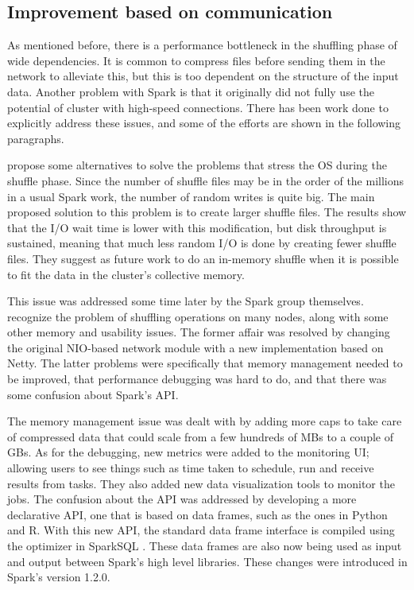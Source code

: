 \documentclass{article}
\begin{document}
\subsection{Improvement based on communication}

As mentioned before, there is a performance bottleneck in the shuffling phase of wide dependencies. It is common to compress files before sending them in the network to alleviate this, but this is too dependent on the structure of the input data. Another problem with Spark is that it originally did not fully use the potential of cluster with high-speed connections. There has been work done to explicitly address these issues, and some of the efforts are shown in the following paragraphs.

\citeauthor{davidson2013optimizing} \cite{davidson2013optimizing} propose some alternatives to solve the problems that stress the OS during the shuffle phase. Since the number of shuffle files may be in the order of the millions in a usual Spark work, the number of random writes is quite big. The main proposed solution to this problem is to create larger shuffle files. The results show that the I/O wait time is lower with this modification, but disk throughput is sustained, meaning that much less random I/O is done by creating fewer shuffle files. They suggest as future work to do an in-memory shuffle when it is possible to fit the data in the cluster's collective memory.

This issue was addressed some time later by the Spark group themselves. \citeauthor{Armbrust2015} \cite{Armbrust2015} recognize the problem of shuffling operations on many nodes, along with some other memory and usability issues. The former affair was resolved by changing the original NIO-based network module with a new implementation based on Netty. The latter problems were specifically that memory management needed to be improved, that performance debugging was hard to do, and that there was some confusion about Spark's API.

The memory management issue was dealt with by adding more caps to take care of compressed data that could scale from a few hundreds of MBs to a couple of GBs. As for the debugging, new metrics were added to the monitoring UI; allowing users to see things such as time taken to schedule, run and receive results from tasks. They also added new data visualization tools to monitor the jobs. The confusion about the API was addressed by developing a more declarative API, one that is based on data frames, such as the ones in Python and R. With this new API, the standard data frame interface is compiled using the optimizer in SparkSQL \cite{armbrust2015spark}. These data frames are also now being used as input and output between Spark's high level libraries. These changes were introduced in Spark's version 1.2.0.
\end{document}
